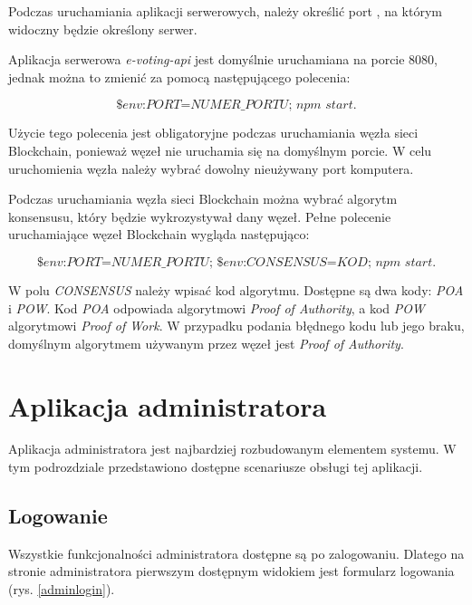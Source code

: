 \documentclass[a4paper,12pt]{book}
\begin{document}
Podczas uruchamiania aplikacji serwerowych, należy określić port , na którym widoczny będzie określony serwer.

Aplikacja serwerowa \textit{e-voting-api} jest domyślnie uruchamiana na porcie 8080, jednak można to zmienić za pomocą następującego polecenia:

\begin{equation}
	\textit{\$env:PORT=NUMER\_PORTU; npm start}.
\end{equation}

Użycie tego polecenia jest obligatoryjne podczas uruchamiania węzła sieci Blockchain, ponieważ węzeł nie uruchamia się na domyślnym porcie. W celu uruchomienia węzła należy wybrać dowolny nieużywany port komputera.

Podczas uruchamiania węzła sieci Blockchain można wybrać algorytm konsensusu, który będzie wykrozystywał dany węzeł. Pełne polecenie uruchamiające węzeł Blockchain wygląda następująco:

\begin{equation}
	\textit{\$env:PORT=NUMER\_PORTU; \$env:CONSENSUS=KOD; npm start}.
\end{equation}

W polu \textit{CONSENSUS} należy wpisać kod algorytmu. Dostępne są dwa kody: \textit{POA} i \textit{POW}. Kod \textit{POA} odpowiada algorytmowi \textit{Proof of Authority}, a kod \textit{POW} algorytmowi \textit{Proof of Work}. W przypadku podania błędnego kodu lub jego braku, domyślnym algorytmem używanym przez węzeł jest \textit{Proof of Authority}.

\newpage

\section{Aplikacja administratora}

Aplikacja administratora jest najbardziej rozbudowanym elementem systemu. W tym podrozdziale przedstawiono dostępne scenariusze obsługi tej aplikacji.

\subsection{Logowanie}

Wszystkie funkcjonalności administratora dostępne są po zalogowaniu. Dlatego na stronie administratora pierwszym dostępnym widokiem jest formularz logowania (rys. \ref{adminlogin}).
\end{document}
